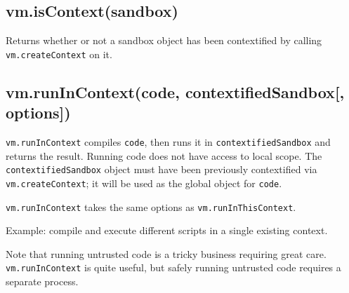 \subsection{vm.isContext(sandbox)}\label{vm.iscontextsandbox}

Returns whether or not a sandbox object has been contextified by calling
\texttt{vm.createContext} on it.

\subsection{vm.runInContext(code, contextifiedSandbox{[},
options{]})}\label{vm.runincontextcode-contextifiedsandbox-options}

\texttt{vm.runInContext} compiles \texttt{code}, then runs it in
\texttt{contextifiedSandbox} and returns the result. Running code does
not have access to local scope. The \texttt{contextifiedSandbox} object
must have been previously contextified via \texttt{vm.createContext}; it
will be used as the global object for \texttt{code}.

\texttt{vm.runInContext} takes the same options as
\texttt{vm.runInThisContext}.

Example: compile and execute different scripts in a single existing
context.

\begin{Shaded}
\begin{Highlighting}[]
 \NormalTok{(}\NormalTok{);}
 \NormalTok{(}\NormalTok{);}

 \NormalTok{: } \NormalTok{\};}

 \NormalTok{(} 
    \NormalTok{(}
\NormalTok{\}}
\NormalTok{(}

\end{Highlighting}
\end{Shaded}

Note that running untrusted code is a tricky business requiring great
care. \texttt{vm.runInContext} is quite useful, but safely running
untrusted code requires a separate process.

